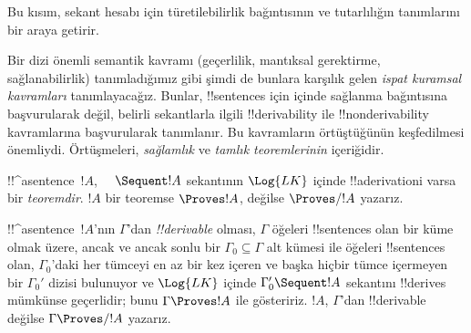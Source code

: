 \documentclass[../../../include/open-logic-section]{subfiles}
\begin{document}
\begin{editorial}
  Bu kısım, sekant hesabı için türetilebilirlik bağıntısının ve tutarlılığın
  tanımlarını bir araya getirir.
\end{editorial}

      {}
      {}


\begin{explain}
Bir dizi önemli semantik kavramı (geçerlilik, mantıksal gerektirme,
sağlanabilirlik) tanımladığımız gibi şimdi de bunlara karşılık gelen
\emph{ispat kuramsal kavramları} tanımlayacağız. Bunlar, !!{sentence}s için
 içinde sağlanma bağıntısına başvurularak değil, belirli sekantlarla ilgili
!!{derivability} ile !!{nonderivability} kavramlarına başvurularak tanımlanır. Bu
kavramların örtüştüğünün keşfedilmesi önemliydi. Örtüşmeleri, \emph{sağlamlık}
ve \emph{tamlık teoremlerinin} içeriğidir.
\end{explain}

\begin{defn}[Teoremler]
!!^a{sentence}~$!A$, $\quad \Sequent !A$ sekantının $\Log{LK}$ içinde
!!a{derivation}{}i varsa bir \emph{teoremdir}. $!A$ bir teoremse $\Proves !A$,
değilse $\Proves/ !A$ yazarız.
\end{defn}

\begin{defn}[!!^{derivability}]
!!^a{sentence}~$!A$'nın $\Gamma$'dan \emph{!!{derivable}} olması,
$\Gamma$ öğeleri !!{sentence}s olan bir küme olmak üzere, ancak ve ancak sonlu bir
$\Gamma_0\subseteq\Gamma$ alt kümesi ile öğeleri !!{sentence}s olan,
$\Gamma_0$'daki her tümceyi en az bir kez içeren ve başka hiçbir tümce
içermeyen bir $\Gamma_0'$ dizisi bulunuyor ve $\Log{LK}$ içinde $\Gamma_0'\Sequent
!A$ sekantını !!{derive}s mümkünse geçerlidir; bunu $\Gamma\Proves !A$ ile gösteririz.
$!A$, $\Gamma$'dan !!{derivable}
değilse $\Gamma \Proves/ !A$ yazarız.
\end{defn}
\end{document}
